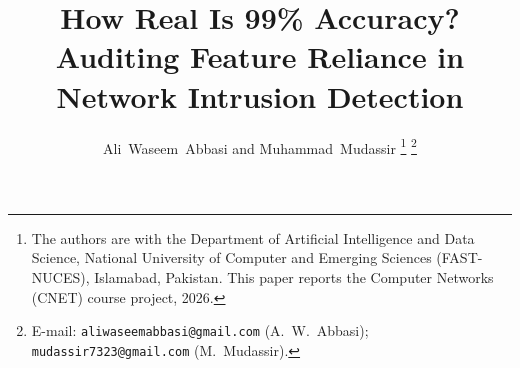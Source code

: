\documentclass[journal]{IEEEtran}
\begin{document}
\title{How Real Is 99\% Accuracy? Auditing Feature Reliance in Network Intrusion Detection}
\author{Ali~Waseem~Abbasi and Muhammad~Mudassir%
\thanks{The authors are with the Department of Artificial Intelligence and Data Science,
National University of Computer and Emerging Sciences (FAST-NUCES), Islamabad, Pakistan.
This paper reports the Computer Networks (CNET) course project, 2026.}%
\thanks{E-mail: \nolinkurl{aliwaseemabbasi@gmail.com} (A.~W.~Abbasi);\\
\nolinkurl{mudassir7323@gmail.com} (M.~Mudassir).}}

\maketitle
\end{document}
